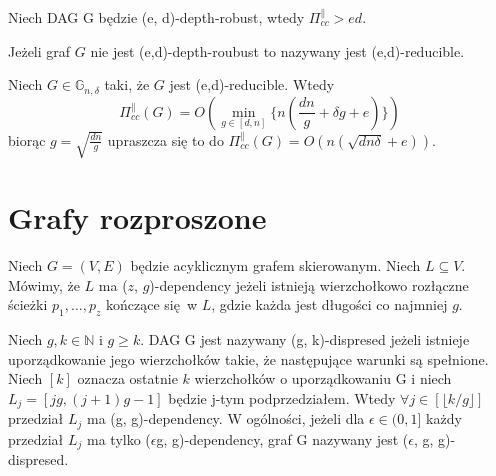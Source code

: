 \begin{theorem} \cite[Twierdzenie 4]{depth}
	Niech DAG G będzie (e, d)-depth-robust, wtedy $ \Pi_{ cc }^{ \parallel } > ed$.
\end{theorem}

\begin{definition}
	Jeżeli graf $G$ nie jest (e,d)-depth-roubust to nazywany jest (e,d)-reducible.
\end{definition}

\begin{theorem} \cite[Twierdzenie 10]{depth} \label{1::redu}
	Niech $G \in \mathbb{G}_{n, \delta}$ taki, że $G$ jest (e,d)-reducible. Wtedy
	$$ \Pi_{cc}^{\parallel}(G) = O \left( \min_{g \in [d,n]} \Big \lbrace n \left( \frac{dn}{g} + \delta g + e \right) \Big \rbrace \right) $$
	biorąc $g = \sqrt{ \frac{dn}{g}}$ upraszcza się to do $ \Pi_{cc}^{\parallel}(G) = O \left( n ( \sqrt{dn \delta} + e) \right)$.
\end{theorem}

\section{Grafy rozproszone}

\begin{definition}
	 Niech $G = (V, E)$ będzie acyklicznym grafem skierowanym.
	Niech $L \subseteq V$.
	Mówimy, że $L$ ma ($z$, $g$)-dependency jeżeli istnieją wierzchołkowo rozłączne ścieżki $p_{1}, \dots , p_{z}$ kończące się w $L$, gdzie każda jest długości co najmniej $g$.
\end{definition}

\begin{definition}
	 Niech $g, k \in \mathbb{N}$ i $g \geq k$. DAG G jest nazywany (g, k)-dispresed jeżeli istnieje uporządkowanie jego wierzchołków takie, że następujące warunki są spełnione.
	Niech $[k]$ oznacza ostatnie $k$ wierzchołków o uporządkowaniu G i niech $L_{j} = [jg, (j + 1)g - 1]$ będzie j-tym podprzedziałem.
	Wtedy $\forall j \in [ \lfloor k / g \rfloor ]$ przedział $L_{j}$ ma (g, g)-dependency.
	W ogólności, jeżeli dla $ \epsilon \in (0, 1] $ każdy przedział $L_{j}$ ma tylko ($\epsilon$g, g)-dependency, graf G nazywany jest ($\epsilon$, g, g)-dispresed.
\end{definition}

